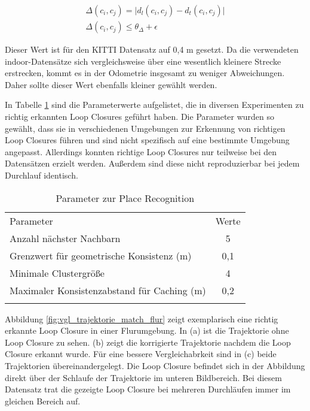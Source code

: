 \begin{subequations}
	\begin{align}
		\Delta(c_i,c_j) = \vert d_l(c_i,c_j)-d_t(c_i,c_j) \vert \\
		\Delta(c_i,c_j) \leq \theta_\Delta+ \epsilon
	\end{align}
\end{subequations}

Dieser Wert ist für den KITTI Datensatz auf 0,4 m gesetzt. Da die verwendeten indoor-Datensätze sich vergleichsweise über eine wesentlich kleinere Strecke erstrecken, kommt es in der Odometrie insgesamt zu weniger Abweichungen. Daher sollte dieser Wert ebenfalls kleiner gewählt werden. 

In Tabelle \ref{tab:Parameter_PR} sind die Parameterwerte aufgelistet, die in diversen Experimenten zu richtig erkannten Loop Closures geführt haben. Die Parameter wurden so gewählt, dass sie in verschiedenen Umgebungen zur Erkennung von richtigen Loop Closures führen und sind nicht spezifisch auf eine bestimmte Umgebung angepasst. Allerdings konnten richtige Loop Closures nur teilweise bei den Datensätzen erzielt werden. Außerdem sind diese nicht reproduzierbar bei jedem Durchlauf identisch.  

\renewcommand{\arraystretch}{1}
\begin {table}[H]
 \centering
 \caption{Parameter zur Place Recognition}
 \label{tab:Parameter_PR}
 \begin{tabular}{ l c }
  \hhline{==}
   Parameter    & Werte  \\
  \hhline{==}
  Anzahl nächster Nachbarn &  5  \\
  \hhline{--}
  Grenzwert für geometrische Konsistenz (m) &  0,1  \\
  \hhline{--}
  Minimale Clustergröße &  4  \tabularnewline
  \hhline{--}
  Maximaler Konsistenzabstand für Caching (m) &  0,2 \\
  \hhline{==}
 \end{tabular}
\end{table}

Abbildung \ref{fig:vgl_trajektorie_match_flur} zeigt  exemplarisch eine richtig erkannte Loop Closure in einer Flur\-um\-ge\-bung. In (a) ist die Trajektorie ohne Loop Closure zu sehen. (b) zeigt die korrigierte Trajektorie nachdem die Loop Closure erkannt wurde. Für eine bessere Vergleichabrkeit sind in (c) beide Trajektorien übereinandergelegt. Die Loop Closure befindet sich in der Abbildung direkt über der Schlaufe der Trajektorie im unteren Bildbereich. Bei diesem Datensatz trat die gezeigte Loop Closure bei mehreren Durchläufen immer im gleichen Bereich auf. 

